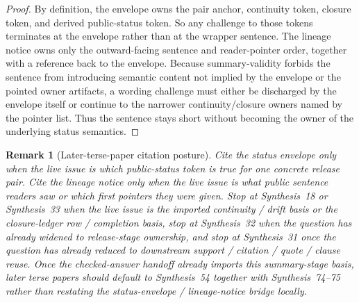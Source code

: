 \documentclass[11pt]{article}
\newtheorem{remark}{Remark}
\begin{document}
\begin{proof}
By definition, the envelope owns the pair anchor, continuity token, closure token, and derived public-status token.
So any challenge to those tokens terminates at the envelope rather than at the wrapper sentence.
The lineage notice owns only the outward-facing sentence and reader-pointer order, together with a reference back to the envelope.
Because summary-validity forbids the sentence from introducing semantic content not implied by the envelope or the pointed owner artifacts, a wording challenge must either be discharged by the envelope itself or continue to the narrower continuity/closure owners named by the pointer list.
Thus the sentence stays short without becoming the owner of the underlying status semantics.
\end{proof}

\begin{remark}[Later-terse-paper citation posture]
Cite the status envelope only when the live issue is \emph{which public-status token is true} for one concrete release pair.
Cite the lineage notice only when the live issue is \emph{what public sentence readers saw} or \emph{which first pointers they were given}.
Stop at Synthesis~18 or Synthesis~33 when the live issue is the imported continuity / drift basis or the closure-ledger row / completion basis, stop at Synthesis~32 when the question has already widened to release-stage ownership, and stop at Synthesis~31 once the question has already reduced to downstream support / citation / quote / clause reuse.
Once the checked-answer handoff already imports this summary-stage basis, later terse papers should default to Synthesis~54 together with Synthesis~74--75 rather than restating the status-envelope / lineage-notice bridge locally.\cite{series:planstateequiv,series:releaseclosure,series:releasespine,series:downstreamnormalforms,series:challengeanswerreviewmenus,series:pairedterminalcitationdiscipline,series:pairedterminalcutoverrules}
\end{remark}
\end{document}
